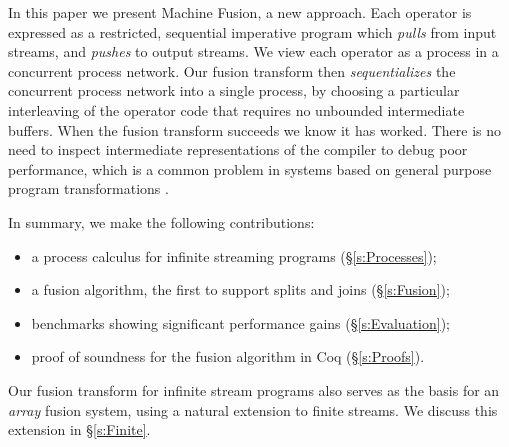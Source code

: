 In this paper we present Machine Fusion, a new approach. Each operator is expressed as a restricted, sequential imperative program which \emph{pulls} from input streams, and \emph{pushes} to output streams. We view each operator as a process in a concurrent process network. Our fusion transform then \emph{sequentializes} the concurrent process network into a single process, by choosing a particular interleaving of the operator code that requires no unbounded intermediate buffers. When the fusion transform succeeds we know it has worked. There is no need to inspect intermediate representations of the compiler to debug poor performance, which is a common problem in systems based on general purpose program transformations \cite{lippmeier2012:guiding}.

In summary, we make the following contributions:
\begin{itemize}
\item a process calculus for infinite streaming programs (\S\ref{s:Processes});
\item a fusion algorithm, the first to support splits and joins (\S\ref{s:Fusion});
\item benchmarks showing significant performance gains (\S\ref{s:Evaluation});
\item proof of soundness for the fusion algorithm in Coq (\S\ref{s:Proofs}).
\end{itemize}

Our fusion transform for infinite stream programs also serves as the basis for an \emph{array} fusion system, using a natural extension to finite streams. We discuss this extension in \S\ref{s:Finite}.

